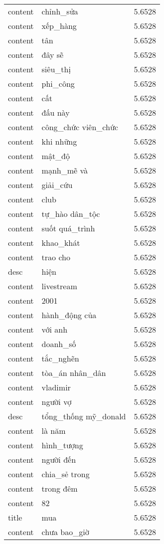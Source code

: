 \documentclass{article}
\begin{document}
\begin{tabular}{lll}
content & chỉnh\_sửa & 5.6528\\
content & xếp\_hàng & 5.6528\\
content & tân & 5.6528\\
content & đây sẽ & 5.6528\\
content & siêu\_thị & 5.6528\\
content & phi\_công & 5.6528\\
content & cất & 5.6528\\
content & đấu này & 5.6528\\
content & công\_chức viên\_chức & 5.6528\\
content & khi những & 5.6528\\
content & mật\_độ & 5.6528\\
content & mạnh\_mẽ và & 5.6528\\
content & giải\_cứu & 5.6528\\
content & club & 5.6528\\
content & tự\_hào dân\_tộc & 5.6528\\
content & suốt quá\_trình & 5.6528\\
content & khao\_khát & 5.6528\\
content & trao cho & 5.6528\\
desc & hiện & 5.6528\\
content & livestream & 5.6528\\
content & 2001 & 5.6528\\
content & hành\_động của & 5.6528\\
content & với anh & 5.6528\\
content & doanh\_số & 5.6528\\
content & tắc\_nghẽn & 5.6528\\
content & tòa\_án nhân\_dân & 5.6528\\
content & vladimir & 5.6528\\
content & người vợ & 5.6528\\
desc & tổng\_thống mỹ\_donald & 5.6528\\
content & là năm & 5.6528\\
content & hình\_tượng & 5.6528\\
content & người đến & 5.6528\\
content & chia\_sẻ trong & 5.6528\\
content & trong đêm & 5.6528\\
content & 82 & 5.6528\\
title & mua & 5.6528\\
content & chưa bao\_giờ & 5.6528\\

\end{tabular}
\end{document}
